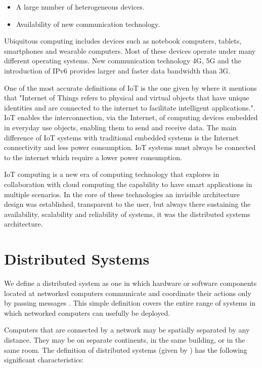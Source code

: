 \begin{itemize}
\item A large number of heterogeneous devices.
\item Availability of new communication technology.
\end{itemize}

Ubiquitous computing includes devices such as notebook computers, tablets, smartphones
and wearable computers. Most of these devices operate under many different
operating systems. New communication technology 4G, 5G and the introduction of
IPv6 provides larger and faster data bandwidth than 3G.

One of the most accurate definitions of IoT is the one given by \cite{Bahga}
where it mentions that "Internet of Things refers to physical and virtual
objects that have unique identities and are connected to the internet to
facilitate intelligent applications.". IoT enables the interconnection, via the
Internet, of computing devices embedded in everyday use objects, enabling them
to send and receive data. The main difference of IoT systems with traditional
embedded systems is the Internet connectivity and less power consumption. IoT
systems must always be connected to the internet which require a lower power
consumption.

IoT computing is a new era of computing technology that explores in
collaboration with cloud computing the capability to have smart applications in
multiple scenarios. In the core of these technologies an invisible architecture
design was established, transparent to the user, but always there sustaining
the availability, scalability and reliability of systems, it was the
distributed systems architecture.

\section{Distributed Systems}
\noindent

We define a distributed system as one in which hardware or software components
located at networked computers communicate and coordinate their actions only by
passing messages \cite{Coulouris}. This simple definition covers the entire
range of systems in which networked computers can usefully be deployed.

Computers that are connected by a network may be spatially separated by any
distance. They may be on separate continents, in the same building, or in the
same room. The definition of distributed systems (given by \cite{Coulouris})
has the following significant characteristics:

